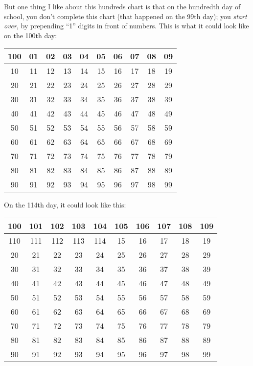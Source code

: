 \documentclass[12pt]{article}
\newcommand{\tablesize}{\footnotesize\sffamily}
\begin{document}
But one thing I like about this hundreds chart is that on the
hundredth day of school, you don't complete this chart (that happened
on the 99th day); you \emph{start over}, by prepending ``1'' digits in
front of numbers.  This is what it could look like on the 100th day:
\begin{center}\tablesize
\begin{tabular}{|c|c|c|c|c|c|c|c|c|c|}
\hline
100 & 01 & 02 & 03 & 04 & 05 & 06 & 07 & 08 & 09 \\ \hline
 10 & 11 & 12 & 13 & 14 & 15 & 16 & 17 & 18 & 19 \\ \hline
 20 & 21 & 22 & 23 & 24 & 25 & 26 & 27 & 28 & 29 \\ \hline
 30 & 31 & 32 & 33 & 34 & 35 & 36 & 37 & 38 & 39 \\ \hline
 40 & 41 & 42 & 43 & 44 & 45 & 46 & 47 & 48 & 49 \\ \hline
 50 & 51 & 52 & 53 & 54 & 55 & 56 & 57 & 58 & 59 \\ \hline
 60 & 61 & 62 & 63 & 64 & 65 & 66 & 67 & 68 & 69 \\ \hline
 70 & 71 & 72 & 73 & 74 & 75 & 76 & 77 & 78 & 79 \\ \hline
 80 & 81 & 82 & 83 & 84 & 85 & 86 & 87 & 88 & 89 \\ \hline
 90 & 91 & 92 & 93 & 94 & 95 & 96 & 97 & 98 & 99 \\ \hline
\end{tabular}
\end{center}
On the 114th day, it could look like this:
\begin{center}\tablesize
\begin{tabular}{|c|c|c|c|c|c|c|c|c|c|}
\hline
100 &101 &102 &103 &104 &105 &106 &107 &108 &109 \\ \hline
110 &111 &112 &113 &114 & 15 & 16 & 17 & 18 & 19 \\ \hline
 20 & 21 & 22 & 23 & 24 & 25 & 26 & 27 & 28 & 29 \\ \hline
 30 & 31 & 32 & 33 & 34 & 35 & 36 & 37 & 38 & 39 \\ \hline
 40 & 41 & 42 & 43 & 44 & 45 & 46 & 47 & 48 & 49 \\ \hline
 50 & 51 & 52 & 53 & 54 & 55 & 56 & 57 & 58 & 59 \\ \hline
 60 & 61 & 62 & 63 & 64 & 65 & 66 & 67 & 68 & 69 \\ \hline
 70 & 71 & 72 & 73 & 74 & 75 & 76 & 77 & 78 & 79 \\ \hline
 80 & 81 & 82 & 83 & 84 & 85 & 86 & 87 & 88 & 89 \\ \hline
 90 & 91 & 92 & 93 & 94 & 95 & 96 & 97 & 98 & 99 \\ \hline
\end{tabular}
\end{center}
\end{document}
